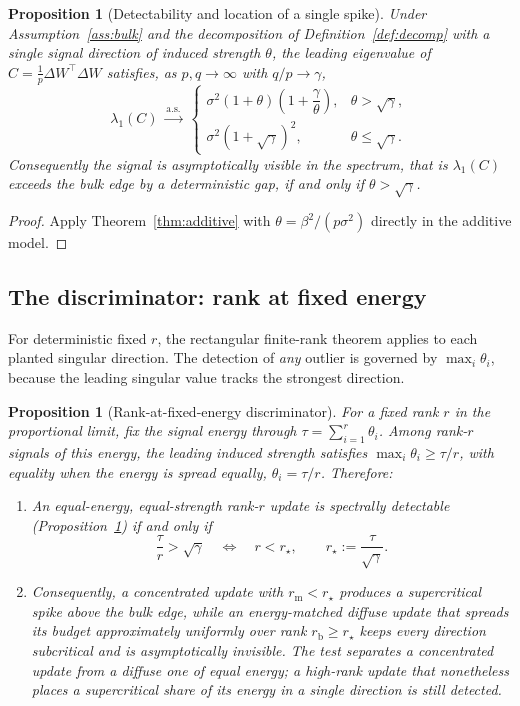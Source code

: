 \documentclass[11pt]{article}
\newtheorem{proposition}[theorem]{Proposition}
\theoremstyle{definition}
\theoremstyle{remark}
\newcommand{\as}{\text{a.s.}}
\newcommand{\dW}{\Delta W}
\begin{document}
\begin{proposition}[Detectability and location of a single spike]
\label{prop:detect}
Under Assumption~\ref{ass:bulk} and the decomposition of Definition~\ref{def:decomp} with
a single signal direction of induced strength $\theta$, the leading eigenvalue of
$C = \tfrac1p \dW^{\!\top}\dW$ satisfies, as $p,q\to\infty$ with $q/p\to\gamma$,
\[
  \lambda_1(C) \;\xrightarrow{\as}\;
  \begin{cases}
    \sigma^2(1+\theta)\!\left(1+\dfrac{\gamma}{\theta}\right), & \theta > \sqrt{\gamma},\\[1.4ex]
    \sigma^2(1+\sqrt\gamma)^2, & \theta \le \sqrt{\gamma}.
  \end{cases}
\]
Consequently the signal is asymptotically visible in the spectrum, that is
$\lambda_1(C)$ exceeds the bulk edge by a deterministic gap, if and only if $\theta >
\sqrt{\gamma}$.
\end{proposition}

\begin{proof}
Apply Theorem~\ref{thm:additive} with
$\theta=\beta^2/(p\sigma^2)$ directly in the additive model.
\end{proof}

\subsection{The discriminator: rank at fixed energy}

For deterministic fixed $r$, the rectangular finite-rank theorem applies to each
planted singular direction. The detection of \emph{any} outlier is governed by
$\max_i\theta_i$, because the leading singular value tracks the strongest direction.

\begin{proposition}[Rank-at-fixed-energy discriminator]
\label{prop:rank}
For a fixed rank $r$ in the proportional limit, fix the signal energy through
$\tau = \sum_{i=1}^r \theta_i$. Among rank-$r$ signals of
this energy, the leading induced strength satisfies $\max_i \theta_i \ge \tau/r$, with
equality when the energy is spread equally, $\theta_i = \tau/r$. Therefore:
\begin{enumerate}[leftmargin=1.6em,itemsep=2pt]
\item An equal-energy, equal-strength rank-$r$ update is spectrally detectable
(Proposition~\ref{prop:detect}) if and only if
\[
  \frac{\tau}{r} > \sqrt{\gamma}
  \quad\Longleftrightarrow\quad
  r < r_\star, \qquad r_\star := \frac{\tau}{\sqrt{\gamma}}.
\]
\item Consequently, a concentrated update with $r_{\mathrm m} < r_\star$ produces a
supercritical spike above the bulk edge, while an energy-matched \emph{diffuse} update that
spreads its budget approximately uniformly over rank $r_{\mathrm b} \ge r_\star$ keeps every
direction subcritical and is asymptotically invisible. The test separates a concentrated
update from a diffuse one of equal energy; a high-rank update that nonetheless places a
supercritical share of its energy in a single direction is still detected.
\end{enumerate}
\end{proposition}
\end{document}
